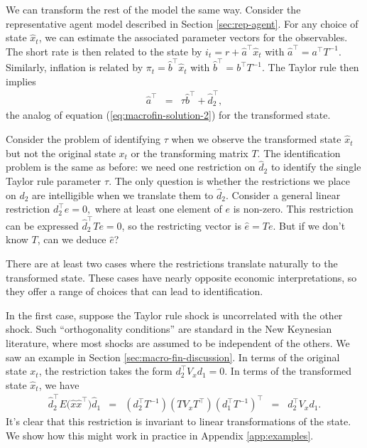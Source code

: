 \documentclass[12pt]{article}
\begin{document}
{We can transform the rest of the model the same way.
Consider the representative agent model described in Section \ref{sec:rep-agent}.
For any choice of state $\hat{x}_t$,
we can estimate the associated parameter vectors for the observables.
The short rate is then related to the state by
$ i_t = r + \hat{a}^{\top} \hat{x}_t$
with $ \hat{a}^{\top } = a^\top T^{-1}$.
Similarly, inflation is related by
$\pi_t = \hat{b}^{\top} \hat{x}_t$ with $ \hat{b}^{\top} = b^\top T^{-1}$.
The Taylor rule then implies
\begin{eqnarray*}
    \hat{a}^{\top} &=& \tau \hat{b}^{\top} + \hat{d}_2^{\top} ,
\end{eqnarray*}
the analog of equation (\ref{eq:macrofin-solution-2}) for the transformed state.

Consider the problem of identifying $\tau$ when we observe
the transformed state $\hat{x}_t$ but not the original state $x_t$
or the transforming matrix $T$.
The identification problem is the same as before:
we need one restriction on $ \hat{d}_2$ to identify
the single Taylor rule parameter $\tau$.
The only question is whether the restrictions we place on $d_2$
are intelligible when we translate them to $\hat{d}_2$.
Consider a general linear restriction $d_2^{\top} e =0,$
where at least one element of $e$ is non-zero.
This restriction can be expressed  $\hat{d}_2^{\top} T e =0$,
so the restricting vector is $\hat{e}=Te$.
But if we don't know $T$, can we deduce $\hat{e}$?

There are at least two cases where the restrictions
translate naturally to the transformed state.
These cases have nearly opposite economic interpretations,
so they offer a range of choices that can lead to identification.

In the first case, suppose the Taylor rule shock is uncorrelated with the other shock.
Such ``orthogonality conditions'' are standard in the New Keynesian literature,
where most shocks are assumed to be independent of the others.
We saw an example in Section \ref{sec:macro-fin-discussion}.
In terms of the original state $x_t$,
the restriction takes the form $ d_2^\top V_x d_1 = 0$.
In terms of the transformed state $\hat{x}_t$, we have
\begin{eqnarray*}
    \hat{d}_2^{\top} E \big( \hat{x}  \hat{x}^{\top} \big) \hat{d}_1
        &=&  (d_2^\top T^{-1}) (T V_x T^\top) (d_1^\top T^{-1})^\top
        \;\;=\;\; d_2^\top V_x d_1 .
\end{eqnarray*}
It's clear that this restriction is invariant to linear transformations of the state.
We show how this might work in practice in Appendix \ref{app:examples}.

}
\end{document}
